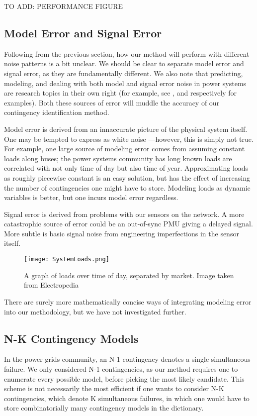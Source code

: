 TO ADD: PERFORMANCE FIGURE

\subsection{Model Error and Signal Error}
Following from the previous section, how our method will perform with different noise patterns is a bit unclear. We should be clear to separate model error and signal error, as they are fundamentally different. We also note that predicting, modeling, and dealing with both model and signal error noise in power systems are research topics in their own right (for example, see \cite{meng2005modeling}, \cite{zimmermann2002analysis} and \cite{chen2006placement} respectively for examples). Both these sources of error will muddle the accuracy of our contingency identification method. 


Model error is derived from an innaccurate picture of the physical system itself. One may be tempted to express as white noise ---however, this is simply not true. For example, one large source of modeling error comes from assuming constant loads along buses; the power systems community has long known loads are correlated with not only time of day but also time of year. Approximating loads as roughly piecewise constant is an easy solution, but has the effect of increasing the number of contingencies one might have to store. Modeling loads as dynamic variables is better, but one incurs model error regardless. 

Signal error is derived from problems with our sensors on the network. A more catastrophic source of error could be an out-of-sync PMU giving a delayed signal. More subtle is basic signal noise from engineering imperfections in the sensor itself. 

\begin{figure}[h!]
    \centering
    \texttt{[image: SystemLoads.png]}
    \caption{A graph of loads over time of day, separated by market. Image taken from Electropedia}
\end{figure}

There are surely more mathematically concise ways of integrating modeling error into our methodology, but we have not investigated further. 

\subsection{N-K Contingency Models}
In the power grids community, an N-1 contingency denotes a single simultaneous failure. We only considered N-1 contingencies, as our method requires one to enumerate every possible model, before picking the most likely candidate. This scheme is not necessarily the most efficient if one wants to consider N-K contingencies, which denote K simultaneous failures, in which one would have to store combinatorially many contingency models in the dictionary. 

